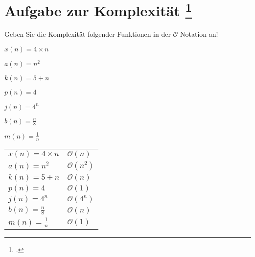 \documentclass{lehramt-informatik-aufgabe}
\begin{document}
\section{Aufgabe zur Komplexität
\footcite[Seite 1-2]{aud:pu:2}}

\noindent
Geben Sie die Komplexität folgender Funktionen in der
$\mathcal{O}$-Notation an!

\begin{compactitem}
\item $x(n) = 4 \times n$
\item $a(n) = n^2$
\item $k(n) = 5 + n$
\item $p(n) = 4$
\item $j(n) = 4^n$
\item $b(n) = \frac{n}{8}$
\item $m(n) = \frac{1}{n}$
\end{compactitem}

\begin{liAntwort}
\begin{tabular}{ll}
$x(n) = 4 \times n$  & $\mathcal{O}(n)$\\
$a(n) = n^2$         & $\mathcal{O}(n^2)$ \\
$k(n) = 5 + n$       & $\mathcal{O}(n)$ \\
$p(n) = 4$           & $\mathcal{O}(1)$ \\
$j(n) = 4^n$         & $\mathcal{O}(4^n)$ \\
$b(n) = \frac{n}{8}$ & $\mathcal{O}(n)$\\
$m(n) = \frac{1}{n}$ & $\mathcal{O}(1)$\\
\end{tabular}
\end{liAntwort}
\end{document}
